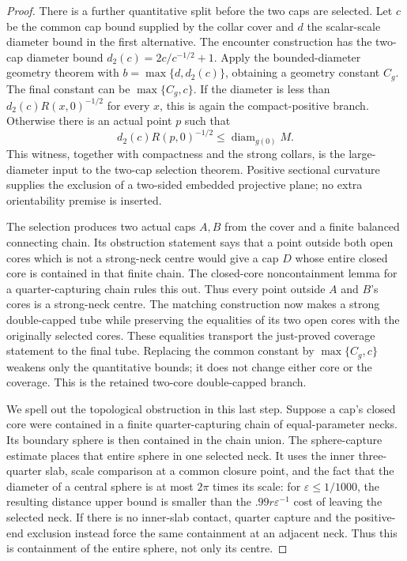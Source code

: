 \begin{proof}
There is a further quantitative split before the two caps are selected.
Let $c$ be the common cap bound supplied by the collar cover and $d$ the
scalar-scale diameter bound in the first alternative.  The encounter
construction has the two-cap diameter bound $d_2(c)=2c/c^{-1/2}+1$.
Apply the bounded-diameter
geometry theorem with $b=\max\{d,d_2(c)\}$, obtaining a geometry constant
$C_g$.  The final constant can be $\max\{C_g,c\}$.  If the diameter is less
than $d_2(c)R(x,0)^{-1/2}$ for every $x$, this is again the compact-positive
branch.  Otherwise there is an actual point $p$ such that
\[
 d_2(c)R(p,0)^{-1/2}\le\operatorname{diam}_{g(0)}M.
\]
This witness, together with compactness and the strong collars, is the
large-diameter input to the two-cap selection theorem.  Positive sectional
curvature supplies the exclusion of a two-sided embedded projective plane;
no extra orientability premise is inserted.

The selection produces two actual caps $A,B$ from the cover and a finite
balanced connecting chain.  Its obstruction statement says that a point
outside both open cores which is not a strong-neck centre would give a cap
$D$ whose entire closed core is contained in that finite chain.  The
closed-core noncontainment lemma for a quarter-capturing chain rules this
out.  Thus every point outside $A$ and $B$'s cores is a strong-neck centre.
The matching construction now makes a strong double-capped tube while
preserving the equalities of its two open cores with the originally selected
cores.  These equalities transport the just-proved coverage statement to the
final tube.  Replacing the common constant by $\max\{C_g,c\}$ weakens only
the quantitative bounds; it does not change either core or the coverage.
This is the retained two-core double-capped branch.

We spell out the topological obstruction in this last step.  Suppose a cap's
closed core were contained in a finite quarter-capturing chain of
equal-parameter necks.  Its boundary sphere is then contained in the chain
union.  The sphere-capture estimate places that entire sphere in one selected
neck.  It uses the inner three-quarter slab, scale comparison at a common
closure point, and the fact that the diameter of a central sphere is at most
$2\pi$ times its scale: for $\varepsilon\le1/1000$, the resulting distance
upper bound is smaller than the $.99r\varepsilon^{-1}$ cost of leaving the
selected neck.  If there is no inner-slab contact, quarter capture and the
positive-end exclusion instead force the same containment at an adjacent
neck.  Thus this is containment of the entire sphere, not only its centre.


\end{proof}
